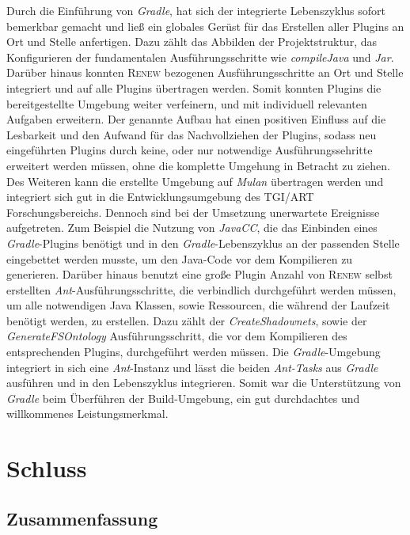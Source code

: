 Durch die Einführung von \textit{Gradle}, hat sich der integrierte Lebenszyklus sofort bemerkbar gemacht und ließ ein globales Gerüst für das Erstellen aller Plugins an Ort und Stelle anfertigen. Dazu zählt das Abbilden der Projektstruktur, das Konfigurieren der fundamentalen Ausführungsschritte wie \textit{compileJava} und \textit{Jar}. Darüber hinaus konnten \textsc{Renew} bezogenen Ausführungsschritte an Ort und Stelle integriert und auf alle Plugins übertragen werden. Somit konnten Plugins die bereitgestellte Umgebung weiter verfeinern, und mit individuell relevanten Aufgaben erweitern. Der genannte Aufbau hat einen positiven Einfluss auf die Lesbarkeit und den Aufwand für das Nachvollziehen der Plugins, sodass neu eingeführten Plugins durch keine, oder nur notwendige Ausführungssehritte erweitert werden müssen, ohne die komplette Umgehung in Betracht zu ziehen. Des Weiteren kann die erstellte Umgebung auf \textit{Mulan} übertragen werden und integriert sich gut in die Entwicklungsumgebung des TGI/ART Forschungsbereichs.\newline
Dennoch sind bei der Umsetzung unerwartete Ereignisse aufgetreten. Zum Beispiel die Nutzung von \textit{JavaCC}, die das Einbinden eines \textit{Gradle}-Plugins benötigt und in den \textit{Gradle}-Lebenszyklus an der passenden Stelle eingebettet werden musste, um den Java-Code vor dem Kompilieren zu generieren. Darüber hinaus benutzt eine große Plugin Anzahl von \textsc{Renew} selbst erstellten \textit{Ant}-Ausführungsschritte, die verbindlich durchgeführt werden müssen, um alle notwendigen Java Klassen, sowie Ressourcen, die während der Laufzeit benötigt werden, zu erstellen. Dazu zählt der \textit{CreateShadownets}, sowie der \textit{GenerateFSOntology} Ausführungsschritt, die vor dem Kompilieren des entsprechenden Plugins, durchgeführt werden müssen. Die \textit{Gradle}-Umgebung integriert in sich eine \textit{Ant}-Instanz und lässt die beiden \textit{Ant-Tasks} aus \textit{Gradle} ausführen und in den Lebenszyklus integrieren. Somit war die Unterstützung von \textit{Gradle} beim Überführen der Build-Umgebung, ein gut durchdachtes und willkommenes Leistungsmerkmal.

\chapter{Schluss}

\section{Zusammenfassung}

